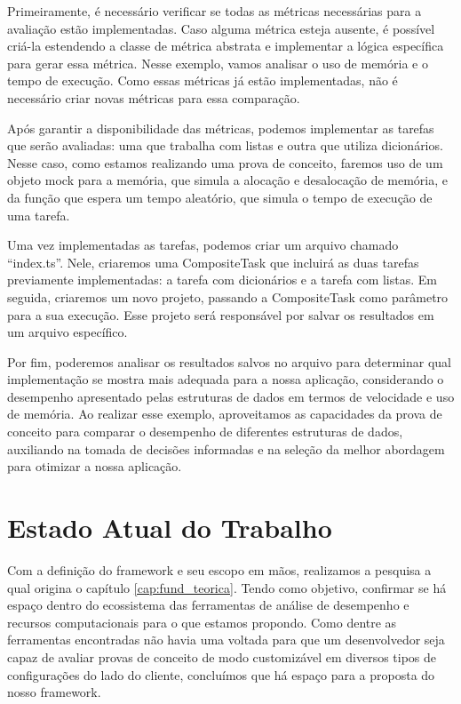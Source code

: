 \documentclass[12pt]{tcc}
\begin{document}
Primeiramente, é necessário verificar se todas as métricas necessárias para a avaliação estão implementadas. Caso alguma métrica esteja ausente, é possível criá-la estendendo a classe de métrica abstrata e implementar a lógica específica para gerar essa métrica. Nesse exemplo, vamos analisar o uso de memória e o tempo de execução. Como essas métricas já estão implementadas, não é necessário criar novas métricas para essa comparação.

Após garantir a disponibilidade das métricas, podemos implementar as tarefas que serão avaliadas: uma que trabalha com listas e outra que utiliza dicionários. Nesse caso, como estamos realizando uma prova de conceito, faremos uso de um objeto mock para a memória, que simula a alocação e desalocação de memória, e da função que espera um tempo aleatório, que simula o tempo de execução de uma tarefa.

Uma vez implementadas as tarefas, podemos criar um arquivo chamado ``index.ts''. Nele, criaremos uma CompositeTask que incluirá as duas tarefas previamente implementadas: a tarefa com dicionários e a tarefa com listas. Em seguida, criaremos um novo projeto, passando a CompositeTask como parâmetro para a sua execução. Esse projeto será responsável por salvar os resultados em um arquivo específico.

Por fim, poderemos analisar os resultados salvos no arquivo para determinar qual implementação se mostra mais adequada para a nossa aplicação, considerando o desempenho apresentado pelas estruturas de dados em termos de velocidade e uso de memória. Ao realizar esse exemplo, aproveitamos as capacidades da prova de conceito para comparar o desempenho de diferentes estruturas de dados, auxiliando na tomada de decisões informadas e na seleção da melhor abordagem para otimizar a nossa aplicação.

\chapter{Estado Atual do Trabalho}
\label{cap:estado_atual}

Com a definição do framework e seu escopo em mãos, realizamos a pesquisa a qual origina o capítulo \ref{cap:fund_teorica}.
Tendo como objetivo, confirmar se há espaço dentro do ecossistema das ferramentas de análise de desempenho e recursos computacionais para o que estamos propondo.
Como dentre as ferramentas encontradas não havia uma voltada para que um desenvolvedor seja capaz de avaliar provas de conceito de modo customizável em diversos tipos de configurações do lado do cliente, concluímos que há espaço para a proposta do nosso framework.
\end{document}
